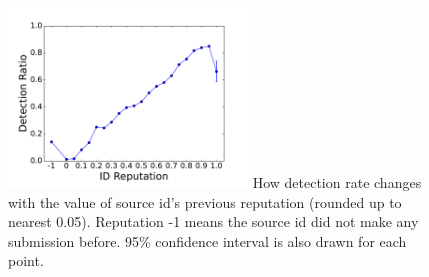 

\begin{figure}[t!]
\begin{center}
\includegraphics[width=2.5in]{figure/IDReputation}
{
How detection rate changes with the value of source id's previous reputation (rounded up to nearest 0.05).
Reputation -1 means the source id did not make any submission before. 95\% confidence interval is also drawn 
for each point.   
}
\end{center}
\end{figure}

